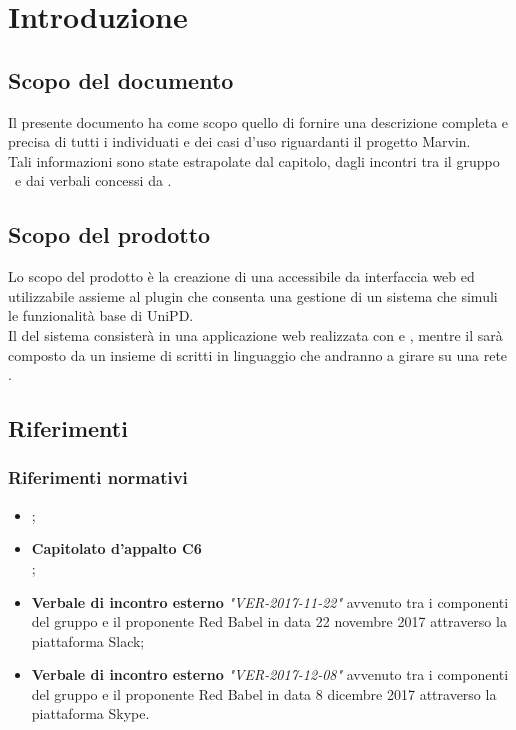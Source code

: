 \documentclass[AnalisiDeiRequisiti.tex]{subfiles}
\begin{document}
\chapter{Introduzione}
\section{Scopo del documento}
Il presente documento ha come scopo quello di fornire una descrizione completa e precisa di tutti i  individuati e dei casi d'uso riguardanti il progetto Marvin.\\
Tali informazioni sono state estrapolate dal capitolo, dagli incontri tra il gruppo \gruppo\ e dai verbali concessi da \Proponente.

\section{Scopo del prodotto}
Lo scopo del prodotto è la creazione di una  accessibile da interfaccia web ed utilizzabile assieme al plugin  che consenta una gestione di un sistema che simuli le funzionalità base di UniPD.\\
Il  del sistema consisterà in una applicazione web realizzata con  e , mentre il  sarà composto da un insieme di  scritti in linguaggio  che andranno a girare su una rete .\\

\glossExpl

\section{Riferimenti}

\subsection{Riferimenti normativi}

\begin{itemize}
	\item \textbf{\ndp \vruno};
	\item \textbf{Capitolato d'appalto C6}\\ ;
	\item \textbf{Verbale di incontro esterno} \textit{"VER-2017-11-22"} avvenuto tra i componenti del gruppo e il proponente Red Babel in data 22 novembre 2017 attraverso la piattaforma Slack;
	\item \textbf{Verbale di incontro esterno} \textit{"VER-2017-12-08"} avvenuto tra i componenti del gruppo e il proponente Red Babel in data 8 dicembre 2017 attraverso la piattaforma Skype.
\end{itemize}
\end{document}
